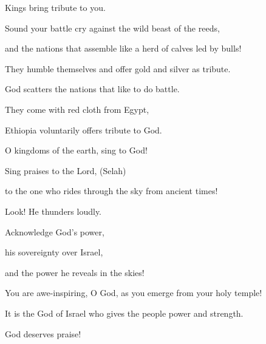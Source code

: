 {\par }{\Q Kings
bring tribute to you.
\par }{\Q {}Sound your battle cry against
the wild beast
of the reeds,
\par }{\Q and the nations
that assemble
like a herd of calves
led by bulls!

\par }{\Q They humble themselves
and offer gold and silver
as tribute.

\par }{\Q God scatters
the nations
that like
to do battle.
\par }{\Q {}They
come
with red cloth from
Egypt,
\par }{\Q Ethiopia
voluntarily offers
tribute
to God.
\par }{\Q {}O kingdoms
of the earth,
sing
to God!
\par }{\Q Sing praises
to the Lord,
(Selah)
\par }{\Q {}to the one who rides
through the sky
from ancient times!

\par }{\Q Look! He thunders loudly.
\par }{\Q {}Acknowledge
God’s
power,

\par }{\Q his sovereignty
over
Israel,
\par }{\Q and the power
he reveals
in the skies!
\par }{\Q {}You are awe-inspiring,
O God,
as you emerge from your holy temple!

\par }{\Q It is
the God
of Israel
who gives
the people
power
and strength.
\par }{\Q God
deserves praise!


\par }
